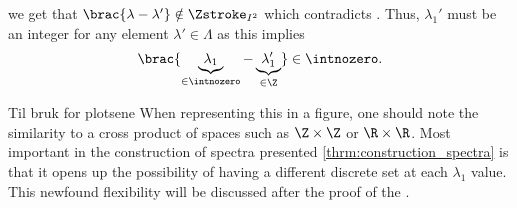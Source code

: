 we get that $\brac{\lambda-\lambda'} \notin \Zstroke_{I^2}$ which contradicts . Thus, $\lambda_1'$ must be an integer for any element $\lambda'\in \Lambda$ as this implies
\begin{align*}  %
    \brac{\underbrace{\lambda_1}_{\in \intnozero}-\underbrace{\lambda_1'}_{\in \Z}} \in \intnozero. %
\end{align*}




Til bruk for plotsene
When representing this in a figure, one should note the similarity to a cross product of spaces such as $\Z \times \Z$ or $\R \times \R$. Most important in the construction of spectra presented \cref{thrm:construction_spectra} is that it opens up the possibility of having a different discrete set at each $\lambda_1$ value. This newfound flexibility will be discussed after the proof of the .






